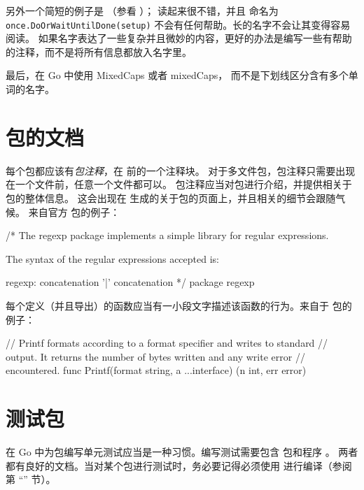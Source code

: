 另外一个简短的例子是 （参看 ）； 读起来很不错，并且
命名为 \lstinline{once.DoOrWaitUntilDone(setup)} 不会有任何帮助。长的名字不会让其变得容易阅读。
如果名字表达了一些复杂并且微妙的内容，更好的办法是编写一些有帮助的注释，而不是将所有信息都放入名字里。

最后，在 Go 中使用 MixedCaps 或者 mixedCaps，
而不是下划线区分含有多个单词的名字。


\section{包的文档}
每个包都应该有\emph{包注释}，在  前的一个注释块。
对于多文件包，包注释只需要出现在一个文件前，任意一个文件都可以。
包注释应当对包进行介绍，并提供相关于包的整体信息。
这会出现在  生成的关于包的页面上，并且相关的细节会跟随气候。
来自官方  包的例子：
\begin{display}
/*
    The regexp package implements a simple library for
    regular expressions.

    The syntax of the regular expressions accepted is:

    regexp:
        concatenation { '|' concatenation }
*/
package regexp
\end{display}

每个定义（并且导出）的函数应当有一小段文字描述该函数的行为。来自于
  包的例子：
\begin{display}
// Printf formats according to a format specifier and writes to standard
// output. It returns the number of bytes written and any write error
// encountered.
func Printf(format string, a ...interface{}) (n int, err error)
\end{display}

\section{测试包}
在 Go 中为包编写单元测试应当是一种习惯。编写测试需要包含
 包和程序 。
两者都有良好的文档。当对某个包进行测试时，务必要记得必须使用
 进行编译（参阅第 ``'' 节）。

